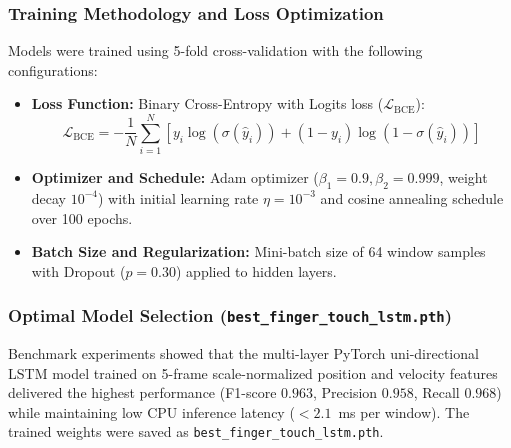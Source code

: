 \subsubsection{Training Methodology and Loss Optimization}
Models were trained using 5-fold cross-validation with the following configurations:
\begin{itemize}
    \item \textbf{Loss Function:} Binary Cross-Entropy with Logits loss ($\mathcal{L}_{\text{BCE}}$):
    \begin{equation}
    \mathcal{L}_{\text{BCE}} = -\frac{1}{N} \sum_{i=1}^N \left[ y_i \log(\sigma(\hat{y}_i)) + (1 - y_i) \log(1 - \sigma(\hat{y}_i)) \right]
    \label{eq:bce_loss}
    \end{equation}
    \item \textbf{Optimizer and Schedule:} Adam optimizer ($\beta_1=0.9, \beta_2=0.999$, weight decay $10^{-4}$) with initial learning rate $\eta = 10^{-3}$ and cosine annealing schedule over 100 epochs.
    \item \textbf{Batch Size and Regularization:} Mini-batch size of 64 window samples with Dropout ($p = 0.30$) applied to hidden layers.
\end{itemize}

\subsubsection{Optimal Model Selection (\texttt{best\_finger\_touch\_lstm.pth})}
Benchmark experiments showed that the multi-layer PyTorch uni-directional LSTM model trained on 5-frame scale-normalized position and velocity features delivered the highest performance (F1-score $0.963$, Precision $0.958$, Recall $0.968$) while maintaining low CPU inference latency ($< 2.1$~ms per window). The trained weights were saved as \texttt{best\_finger\_touch\_lstm.pth}.

